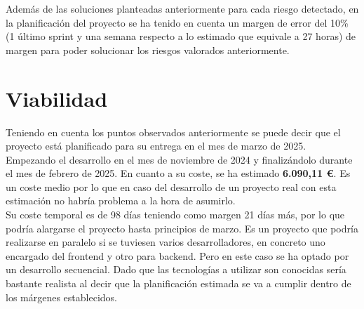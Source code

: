Además de las soluciones planteadas anteriormente para cada riesgo detectado, en la planificación del proyecto se ha tenido en cuenta un margen de error del 10\% (1 último sprint y una semana respecto a lo estimado que equivale a 27 horas) de margen para poder solucionar los riesgos valorados anteriormente.

\section{Viabilidad}

Teniendo en cuenta los puntos observados anteriormente se puede decir que el proyecto está planificado para su entrega en el mes de marzo de 2025. Empezando el desarrollo en el mes de noviembre de 2024 y finalizándolo durante el mes de febrero de 2025. En cuanto a su coste, se ha estimado \textbf{6.090,11 \euro}. Es un coste medio por lo que en caso del desarrollo de un proyecto real con esta estimación no habría problema a la hora de asumirlo.\\
Su coste temporal es de 98 días teniendo como margen 21 días más, por lo que podría alargarse el proyecto hasta principios de marzo. Es un proyecto que podría realizarse en paralelo si se tuviesen varios desarrolladores, en concreto uno encargado del \gls{frontend} y otro para \gls{backend}. Pero en este caso se ha optado por un desarrollo secuencial. Dado que las tecnologías a utilizar son conocidas sería bastante realista al decir que la planificación estimada se va a cumplir dentro de los márgenes establecidos.\\
